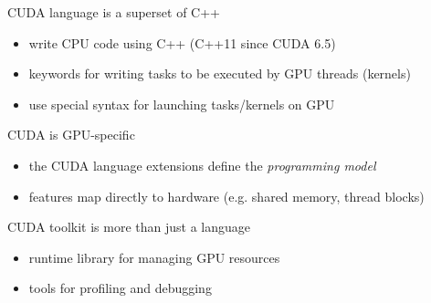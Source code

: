 \begin{frame}[fragile]{}
    \begin{info}{CUDA language is a superset of C++}
        \begin{itemize}
            \item write CPU code using C++ (C++11 since CUDA 6.5)
            \item keywords for writing tasks to be executed by GPU threads (kernels)
            \item use special syntax for launching tasks/kernels on GPU
        \end{itemize}
    \end{info}

    \begin{info}{CUDA is GPU-specific}
        \begin{itemize}
            \item the CUDA language extensions define the \emph{programming model}
            \item features map directly to hardware (e.g. shared memory, thread blocks)
        \end{itemize}
    \end{info}

    \begin{info}{CUDA toolkit is more than just a language}
        \begin{itemize}
            \item runtime library for managing GPU resources
            \item tools for profiling and debugging
        \end{itemize}
    \end{info}
\end{frame}



